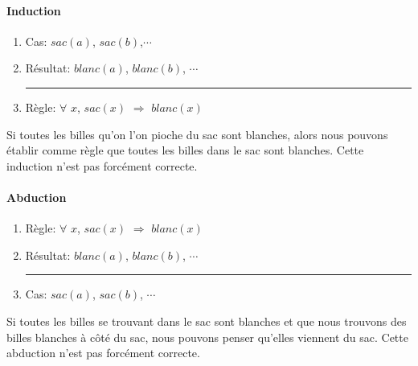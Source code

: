 \paragraph{Induction}

\begin{enumerate}
  \item Cas: $sac(a)$, $sac(b)$,$\cdots$
  \item Résultat: $blanc(a)$, $blanc(b)$, $\cdots$\\
  \rule{5.5cm}{.1pt}	
  \item Règle: $\forall$ $x$, $sac(x)$ $\Rightarrow$ $blanc(x)$
\end{enumerate}

Si toutes les billes qu'on l'on pioche du sac sont blanches, alors nous pouvons établir comme règle que toutes les billes dans le sac sont blanches. Cette induction n'est pas forcément correcte.

\paragraph{Abduction}

\begin{enumerate}
  \item Règle: $\forall$ $x$, $sac(x)$ $\Rightarrow$ $blanc(x)$
  \item Résultat: $blanc(a)$, $blanc(b)$, $\cdots$\\
  \rule{5.5cm}{.1pt}
  \item Cas: $sac(a)$, $sac(b)$, $\cdots$
\end{enumerate}

Si toutes les billes se trouvant dans le sac sont blanches et que nous trouvons des billes blanches à côté du sac, nous pouvons penser qu'elles viennent du sac. Cette abduction n'est pas forcément correcte.
